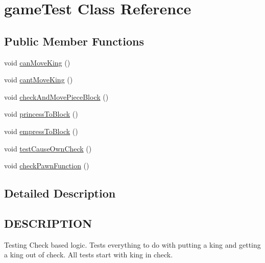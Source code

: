 \hypertarget{classgameTest}{\section{game\-Test Class Reference}
\label{classgameTest}
}
\subsection*{Public Member Functions}
\begin{DoxyCompactItemize}
\item 
void \hyperlink{classgameTest_a704a7770c9d5f183fd81e721870b8e05}{can\-Move\-King} ()
\item 
void \hyperlink{classgameTest_ad25897edb23f02c58482f47417549bf4}{cant\-Move\-King} ()
\item 
void \hyperlink{classgameTest_a6efbf26671cc0a88367bc1d34b2e56f8}{check\-And\-Move\-Piece\-Block} ()
\item 
void \hyperlink{classgameTest_a13c4f0101503f1357afeddc1ef2b028a}{princess\-To\-Block} ()
\item 
void \hyperlink{classgameTest_a4aad3a5dbc122eb1fe838762f04520a7}{empress\-To\-Block} ()
\item 
void \hyperlink{classgameTest_a9322327407eb1d9ad0e9d4fee1d9137f}{test\-Cause\-Own\-Check} ()
\item 
void \hyperlink{classgameTest_a6f1a952d9bdf97215f37b63c41d0af9f}{check\-Pawn\-Function} ()
\end{DoxyCompactItemize}


\subsection{Detailed Description}
\hypertarget{classvalidMoveTest_DESCRIPTION}{}\subsection{D\-E\-S\-C\-R\-I\-P\-T\-I\-O\-N}\label{classvalidMoveTest_DESCRIPTION}
Testing Check based logic. Tests everything to do with putting a king and getting a king out of check. All tests start with king in check. 

